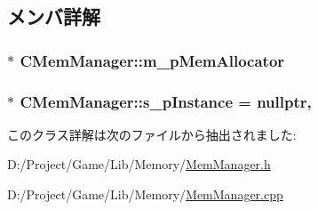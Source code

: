 \subsection{メンバ詳解}
\hypertarget{class_c_mem_manager_acd96a41742f12df42ff02e903787e2e3}{}
\subsubsection[{m\+\_\+p\+Mem\+Allocator}]{$\ast$ C\+Mem\+Manager\+::m\+\_\+p\+Mem\+Allocator\hspace{0.3cm}{\ttfamily [private]}}\label{class_c_mem_manager_acd96a41742f12df42ff02e903787e2e3}
\hypertarget{class_c_mem_manager_a26bbc1442dd2a4f87159c40c55a704d0}{}
\subsubsection[{s\+\_\+p\+Instance}]{ $\ast$ C\+Mem\+Manager\+::s\+\_\+p\+Instance = nullptr\hspace{0.3cm}{\ttfamily [static]}, {\ttfamily [private]}}\label{class_c_mem_manager_a26bbc1442dd2a4f87159c40c55a704d0}


このクラス詳解は次のファイルから抽出されました\+:\begin{DoxyCompactItemize}
\item 
D\+:/\+Project/\+Game/\+Lib/\+Memory/\hyperlink{_mem_manager_8h}{Mem\+Manager.\+h}\item 
D\+:/\+Project/\+Game/\+Lib/\+Memory/\hyperlink{_mem_manager_8cpp}{Mem\+Manager.\+cpp}\end{DoxyCompactItemize}
